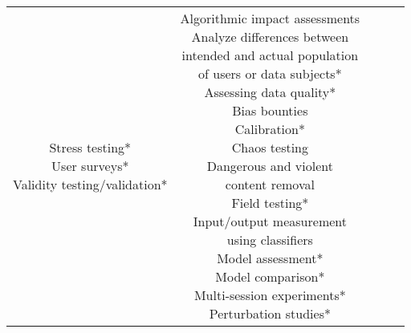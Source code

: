 \documentclass[fleqn]{article}
\begin{document}
\begin{landscape}
\begin{table}[H]
\begin{tabular}{|c|c|c|c|c|}
{			\textbullet\hspace{3pt} Stress testing*\\  		
			\textbullet\hspace{3pt} User surveys*\\  	
			\textbullet\hspace{3pt} Validity testing/validation*\\ 
		} 
		& \makecell[l]{
			\textbullet\hspace{3pt} Algorithmic impact assessments\\  	
			\textbullet\hspace{3pt} Analyze differences between\\\hspace{10pt}intended and actual population\\\hspace{10pt}of users or data subjects*\\ 	 	
			\textbullet\hspace{3pt} Assessing data quality*\\  	 	
			\textbullet\hspace{3pt} Bias bounties\\  	
			\textbullet\hspace{3pt} Calibration*\\  	
			\textbullet\hspace{3pt} Chaos testing\\  	
			\textbullet\hspace{3pt} Dangerous and violent
			\\\hspace{10pt}content removal\\  		
			\textbullet\hspace{3pt} Field testing*\\  	
			\textbullet\hspace{3pt} Input/output measurement\\\hspace{10pt}using classifiers \\ 
			\textbullet\hspace{3pt} Model assessment*\\  	
			\textbullet\hspace{3pt} Model comparison*\\  	
			\textbullet\hspace{3pt} Multi-session experiments*\\  	
			\textbullet\hspace{3pt} Perturbation studies*\\  		
}
\end{tabular}
\end{table}
\end{landscape}
\end{document}

